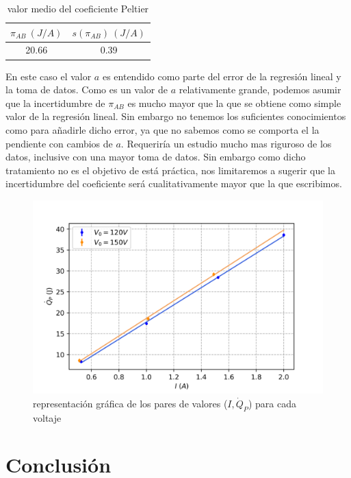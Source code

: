 \documentclass[12pt,a4paper]{article}
\begin{document}
\begin{table}[h!] 	 \centering 
\begin{tabular}{|c|c|} 
\hline 
$ \pi_{AB} \ (J/A)$ & $s(\pi_{AB}) \ (J/A)$  \\ \hline 
20.66 & 0.39 \\ 
\hline
\end{tabular} 
\caption{valor medio del coeficiente Peltier} 
\label{tab:20} 
\end{table} 


En este caso el valor $a$ es entendido como parte del error de la regresión lineal y la toma de datos. Como es un valor de $a$ relativamente grande, podemos asumir que la incertidumbre de $\pi_{AB}$ es mucho mayor que la que se obtiene como simple valor de la regresión lineal. Sin embargo no tenemos los suficientes conocimientos como para añadirle dicho error, ya que no sabemos como se comporta el la pendiente con cambios de $a$. Requeriría un estudio mucho mas riguroso de los datos, inclusive con una mayor toma de datos. Sin embargo como dicho tratamiento no es el objetivo de está práctica, nos limitaremos a sugerir que la incertidumbre del coeficiente será cualitativamente mayor que la que escribimos. 


\begin{figure}[h!] 	 \centering 
\includegraphics[scale=1]{plot-coeficiente-peltier.png} 
\caption{representación gráfica de los pares de valores ($I,\dot{Q}_P$) para cada voltaje} 
\label{Fig:graficapeltier7}
\end{figure} 



\newpage

\newpage

\section{Conclusión}
\end{document}
